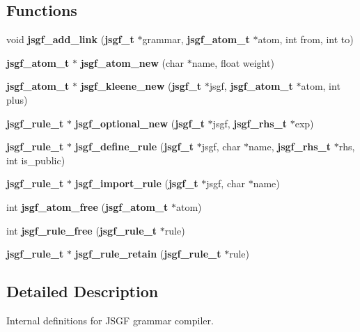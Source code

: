 \subsection*{Functions}
\begin{DoxyCompactItemize}
\item 
void {\bfseries jsgf\+\_\+add\+\_\+link} ({\bf jsgf\+\_\+t} $\ast$grammar, {\bf jsgf\+\_\+atom\+\_\+t} $\ast$atom, int from, int to)\label{jsgf__internal_8h_acb5af4a04abc56a8584eba9b937f8154}

\item 
{\bf jsgf\+\_\+atom\+\_\+t} $\ast$ {\bfseries jsgf\+\_\+atom\+\_\+new} (char $\ast$name, float weight)\label{jsgf__internal_8h_a0e59b63784fa8761358bb2bdf568bec1}

\item 
{\bf jsgf\+\_\+atom\+\_\+t} $\ast$ {\bfseries jsgf\+\_\+kleene\+\_\+new} ({\bf jsgf\+\_\+t} $\ast$jsgf, {\bf jsgf\+\_\+atom\+\_\+t} $\ast$atom, int plus)\label{jsgf__internal_8h_ab9dc2ab39224cda76c43822150cf7e67}

\item 
{\bf jsgf\+\_\+rule\+\_\+t} $\ast$ {\bfseries jsgf\+\_\+optional\+\_\+new} ({\bf jsgf\+\_\+t} $\ast$jsgf, {\bf jsgf\+\_\+rhs\+\_\+t} $\ast$exp)\label{jsgf__internal_8h_a4a07cb0721add8783f0ea24dfacd6c0f}

\item 
{\bf jsgf\+\_\+rule\+\_\+t} $\ast$ {\bfseries jsgf\+\_\+define\+\_\+rule} ({\bf jsgf\+\_\+t} $\ast$jsgf, char $\ast$name, {\bf jsgf\+\_\+rhs\+\_\+t} $\ast$rhs, int is\+\_\+public)\label{jsgf__internal_8h_ae7e6644fc37252110c3c0ea0edd229f7}

\item 
{\bf jsgf\+\_\+rule\+\_\+t} $\ast$ {\bfseries jsgf\+\_\+import\+\_\+rule} ({\bf jsgf\+\_\+t} $\ast$jsgf, char $\ast$name)\label{jsgf__internal_8h_afe1e47584e4dd80929552ffed77373f2}

\item 
int {\bfseries jsgf\+\_\+atom\+\_\+free} ({\bf jsgf\+\_\+atom\+\_\+t} $\ast$atom)\label{jsgf__internal_8h_a289d683bf62d1a5aaac6917fa64f54f2}

\item 
int {\bfseries jsgf\+\_\+rule\+\_\+free} ({\bf jsgf\+\_\+rule\+\_\+t} $\ast$rule)\label{jsgf__internal_8h_af2faf6fb74ad1e4d43cf990c1bcec672}

\item 
{\bf jsgf\+\_\+rule\+\_\+t} $\ast$ {\bfseries jsgf\+\_\+rule\+\_\+retain} ({\bf jsgf\+\_\+rule\+\_\+t} $\ast$rule)\label{jsgf__internal_8h_ad152a23eb0f0d9af8417919fc93074fd}

\end{DoxyCompactItemize}


\subsection{Detailed Description}
Internal definitions for J\+S\+G\+F grammar compiler. 

